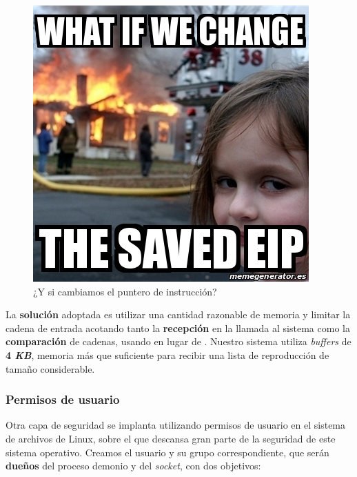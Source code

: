 \begin{figure}[H]
	\noindent \begin{centering}
		\includegraphics[width=\linewidth/3]{capitulo5/disaster_girl}
		\par\end{centering}
	\smallskip
	\caption{\label{fig:disaster_girl} ¿Y si cambiamos el puntero de instrucción?}
\end{figure} 

\smallskip

La \textbf{solución} adoptada es utilizar una cantidad razonable de memoria y limitar la cadena de entrada acotando tanto la \textbf{recepción} en la llamada al sistema  como la \textbf{comparación} de cadenas, usando  en lugar de . Nuestro sistema utiliza \textit{buffers} de \textbf{4 \textit{KB}}, memoria más que suficiente para recibir una lista de reproducción de tamaño considerable.

\subsubsection{Permisos de usuario}

Otra capa de seguridad se implanta utilizando permisos de usuario en el sistema de archivos de Linux, sobre el que descansa gran parte de la seguridad de este sistema operativo. Creamos el usuario \textbf{} y su grupo correspondiente, que serán \textbf{dueños} del proceso demonio y del \textit{socket}, con dos objetivos:

